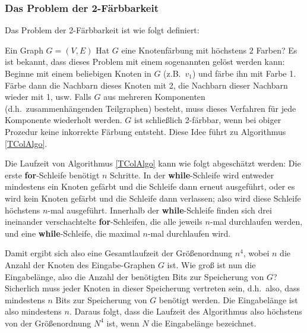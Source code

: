 \subsubsection{Das Problem der 2-Färbbarkeit}
Das Problem der 2-Färbbarkeit ist wie folgt definiert:

{Ein Graph $G=(V,E)$}
{Hat $G$ eine Knotenfärbung mit höchstens $2$ Farben?}
Es ist bekannt, dass dieses Problem mit einem sogenannten
 gelöst werden kann: Beginne mit einem
beliebigen Knoten in $G$ (z.B.~$v_1$) und färbe ihn mit Farbe 1. Färbe
dann die Nachbarn dieses Knoten mit 2, die Nachbarn dieser Nachbarn
wieder mit 1, usw.  Falls $G$ aus mehreren Komponenten
(d.h.~zusammenhängenden Teilgraphen) besteht, muss dieses Verfahren
für jede Komponente wiederholt werden. $G$ ist schließlich 2-färbbar,
wenn bei obiger Prozedur keine inkorrekte Färbung entsteht. Diese Idee
führt zu Algorithmus \ref{TColAlgo}.

Die Laufzeit von Algorithmus \ref{TColAlgo} kann wie folgt abgeschätzt
werden: Die erste \textbf{for}-Schleife benötigt $n$ Schritte.  In der
\textbf{while}-Schleife wird entweder mindestens ein Knoten gefärbt
und die Schleife dann erneut ausgeführt, oder es wird kein Knoten
gefärbt und die Schleife dann verlassen; also wird diese Schleife
höchstens $n$-mal ausgeführt. Innerhalb der \textbf{while}-Schleife
finden sich drei ineinander verschachtelte \textbf{for}-Schleifen, die
alle jeweils $n$-mal durchlaufen werden, und eine
\textbf{while}-Schleife, die maximal $n$-mal durchlaufen wird.

Damit ergibt sich also eine Gesamtlaufzeit der Größenordnung $n^4$,
wobei $n$ die Anzahl der Knoten des Eingabe-Graphen $G$ ist. Wie groß
ist nun die Eingabelänge, also die Anzahl der benötigten Bits zur
Speicherung von $G$?  Sicherlich muss jeder Knoten in dieser
Speicherung vertreten sein, d.h.~also, dass mindestens $n$ Bits zur
Speicherung von $G$ benötigt werden. Die Eingabelänge ist also
mindestens $n$. Daraus folgt, dass die Laufzeit des Algorithmus also
höchstens von der Größenordnung $N^4$ ist, wenn $N$ die Eingabelänge
bezeichnet.

